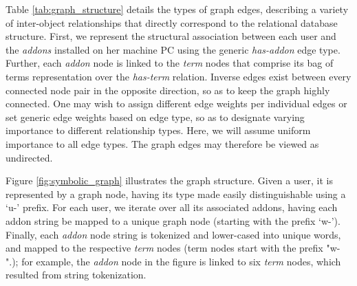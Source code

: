 \documentclass[ijoc,nonblindrev]{informs3} %
\numberwithin{equation}{subsection}
\begin{document}
Table \ref{tab:graph_structure} details the types of graph edges, describing a variety of inter-object relationships that directly correspond to the relational database structure.  First, we represent the structural association between each user and the {\it addons} installed on her machine PC using the generic {\it has-addon} edge type. Further, each {\it addon} node is linked to the {\it term} nodes that comprise its bag of terms representation over the {\it has-term} relation. Inverse edges exist between every connected node pair in the opposite direction, so as to keep the graph highly connected. One may wish to assign different edge weights per individual edges or set generic edge weights based on edge type, so as to designate varying importance to different relationship types. Here, we will assume uniform importance to all edge types. The graph edges may therefore be viewed as undirected. 

Figure \ref{fig:symbolic_graph} illustrates the graph structure. Given a user, it is represented by a graph node, having its type made easily distinguishable using a `u-' prefix. For each user, we iterate over all its associated addons, having each addon string be mapped to a unique graph node (starting with the prefix `w-'). Finally, each {\it addon} node string is tokenized and lower-cased into unique words, and mapped to the respective {\it term} nodes (term nodes start with the prefix "w-".); for example, the {\it addon} node in the figure is linked to six {\it term} nodes, which resulted from string tokenization.

  
\end{document}
